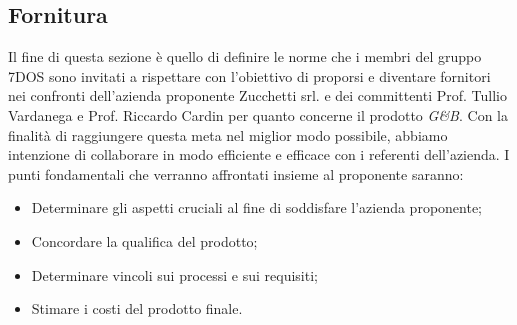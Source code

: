 \subsection{Fornitura}
Il fine di questa sezione è quello di definire le norme che i membri del gruppo 7DOS sono invitati a rispettare con l'obiettivo di proporsi e diventare fornitori nei confronti dell'azienda proponente Zucchetti srl. e dei committenti Prof. Tullio Vardanega e Prof. Riccardo Cardin per quanto concerne il prodotto \emph{G\&B}.
Con la finalità di raggiungere questa meta nel miglior modo possibile, abbiamo intenzione di collaborare in modo efficiente e efficace con i referenti dell'azienda. 
I punti fondamentali che verranno affrontati insieme al proponente saranno:
\begin{itemize}
\item Determinare gli aspetti cruciali al fine di soddisfare l'azienda proponente;
\item Concordare la qualifica del prodotto;
\item Determinare vincoli sui processi e sui requisiti;
\item Stimare i costi del prodotto finale.
\end{itemize}
